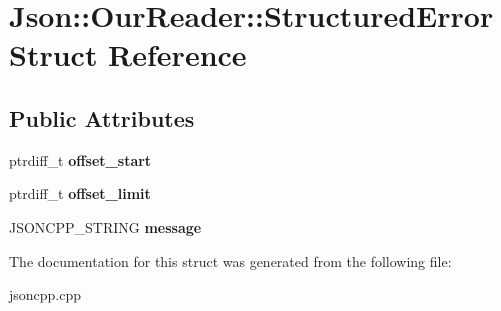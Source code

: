 \hypertarget{structJson_1_1OurReader_1_1StructuredError}{}\section{Json\+:\+:Our\+Reader\+:\+:Structured\+Error Struct Reference}
\label{structJson_1_1OurReader_1_1StructuredError}
\subsection*{Public Attributes}
\begin{DoxyCompactItemize}
\item 
\mbox{\label{structJson_1_1OurReader_1_1StructuredError_a102677698afb8177c985e72dafe72b15}} 
ptrdiff\+\_\+t {\bfseries offset\+\_\+start}
\item 
\mbox{\label{structJson_1_1OurReader_1_1StructuredError_a15491a751a39c5153af04e68b1d0abb9}} 
ptrdiff\+\_\+t {\bfseries offset\+\_\+limit}
\item 
\mbox{\label{structJson_1_1OurReader_1_1StructuredError_a9d0b9986bf765d067dfcf2f971a450d1}} 
J\+S\+O\+N\+C\+P\+P\+\_\+\+S\+T\+R\+I\+NG {\bfseries message}
\end{DoxyCompactItemize}


The documentation for this struct was generated from the following file\+:\begin{DoxyCompactItemize}
\item 
jsoncpp.\+cpp\end{DoxyCompactItemize}
